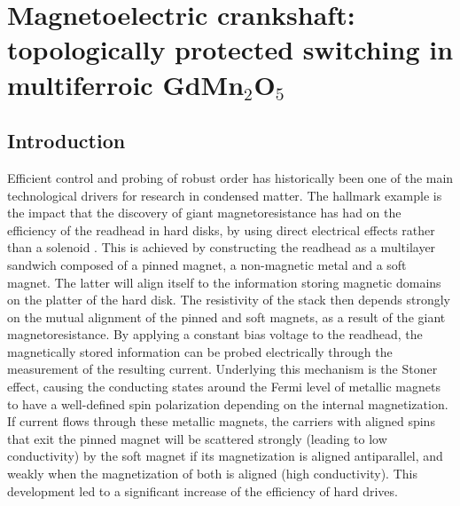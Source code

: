 \newcommand{\Jpar}{J_{||}}
\newcommand{\Jperp}{J_{\perp}}
\chapter{Magnetoelectric crankshaft: topologically protected switching in multiferroic GdMn$_2$O$_5$ \label{ch:GdMn2O5}}
\section{Introduction}
Efficient control and probing of robust order has historically been one of the main technological drivers for research in condensed matter.
The hallmark example is the impact that the discovery of giant magnetoresistance has had on the efficiency of the readhead in hard disks, by using direct electrical effects rather than a solenoid \cite{Baibich1988,Binasch1989,Tsymbal2001,Nunez2006TheoryMetals,Chappert2007}.
This is achieved by constructing the readhead as a multilayer sandwich composed of a pinned magnet, a non-magnetic metal and a soft magnet.
The latter will align itself to the information storing magnetic domains on the platter of the hard disk.
The resistivity of the stack then depends strongly on the mutual alignment of the pinned and soft magnets, as a result of the giant magnetoresistance.
By applying a constant bias voltage to the readhead, the magnetically stored information can be probed electrically through the measurement of the resulting current.
Underlying this mechanism is the Stoner effect, causing the conducting states around the Fermi level of metallic magnets to have a well-defined spin polarization depending on the internal magnetization.
If current flows through these metallic magnets, the carriers with aligned spins that exit the pinned magnet will be scattered strongly (leading to low conductivity) by the soft magnet if its magnetization is aligned antiparallel, and weakly when the magnetization of both is aligned (high conductivity).
This development led to a significant increase of the efficiency of hard drives.

